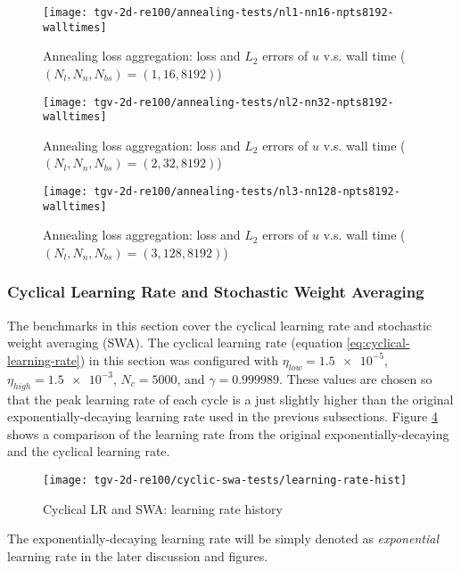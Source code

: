 \begin{figure}[hbt!]
    \centering%
    \texttt{[image: tgv-2d-re100/annealing-tests/nl1-nn16-npts8192-walltimes]}%
    \caption[%
        Annealing loss aggregation: loss and $L_2$ errors of $u$ v.s. wall time ($(N_l, N_n, N_{bs})=(1, 16, 8192)$)%
    ]{%
        Annealing loss aggregation: loss and $L_2$ errors of $u$ v.s. wall time ($(N_l, N_n, N_{bs})=(1, 16, 8192)$)%
    }\label{fig:annealing-tests-nl1-nn16-npts8192-walltimes}%
\end{figure}

\begin{figure}[hbt!]
    \centering%
    \texttt{[image: tgv-2d-re100/annealing-tests/nl2-nn32-npts8192-walltimes]}%
    \caption[%
        Annealing loss aggregation: loss and $L_2$ errors of $u$ v.s. wall time ($(N_l, N_n, N_{bs})=(2, 32, 8192)$)%
    ]{%
        Annealing loss aggregation: loss and $L_2$ errors of $u$ v.s. wall time ($(N_l, N_n, N_{bs})=(2, 32, 8192)$)%
    }\label{fig:annealing-tests-nl2-nn32-npts8192-walltimes}%
\end{figure}

\begin{figure}[hbt!]
    \centering%
    \texttt{[image: tgv-2d-re100/annealing-tests/nl3-nn128-npts8192-walltimes]}%
    \caption[%
        Annealing loss aggregation: loss and $L_2$ errors of $u$ v.s. wall time ($(N_l, N_n, N_{bs})=(3, 128, 8192)$)%
    ]{%
        Annealing loss aggregation: loss and $L_2$ errors of $u$ v.s. wall time ($(N_l, N_n, N_{bs})=(3, 128, 8192)$)%
    }\label{fig:annealing-tests-nl3-nn128-npts8192-walltimes}%
\end{figure}

\subsubsection{Cyclical Learning Rate and Stochastic Weight Averaging}

The benchmarks in this section cover the cyclical learning rate and stochastic weight averaging (SWA).
The cyclical learning rate (equation \eqref{eq:cyclical-learning-rate}) in this section was configured with $\eta_{low}=\num{1.5e-5}$, $\eta_{high}=\num{1.5e-3}$, $N_c=5000$, and $\gamma=0.999989$.
These values are chosen so that the peak learning rate of each cycle is a just slightly higher than the original exponentially-decaying learning rate used in the previous subsections.
Figure \ref{fig:cyclic-swa-tests-lr-hist} shows a comparison of the learning rate from the original exponentially-decaying and the cyclical learning rate.
\begin{figure}[hbt!]
    \centering%
    \texttt{[image: tgv-2d-re100/cyclic-swa-tests/learning-rate-hist]}%
    \caption[%
        Cyclical LR and SWA: learning rate history%
    ]{%
        Cyclical LR and SWA: learning rate history%
    }\label{fig:cyclic-swa-tests-lr-hist}%
\end{figure}
The exponentially-decaying learning rate will be simply denoted as {\it exponential} learning rate in the later discussion and figures.

